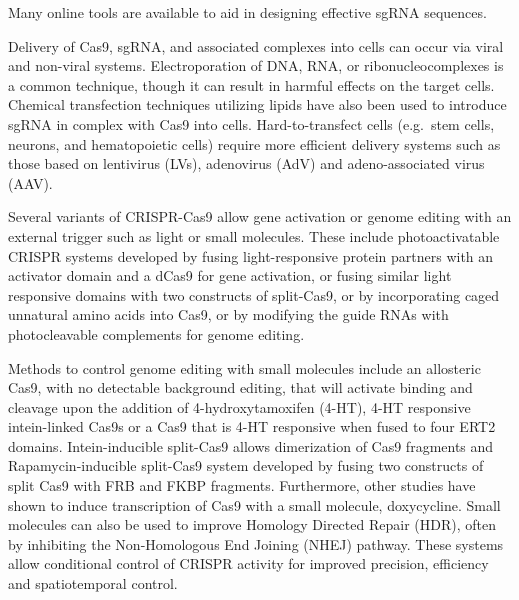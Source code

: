 Many online tools are available to aid in designing effective sgRNA sequences.

Delivery of Cas9, sgRNA, and associated complexes into cells can occur via viral and non-viral systems. Electroporation of DNA, RNA, or ribonucleocomplexes is a common technique, though it can result in harmful effects on the target cells. Chemical transfection techniques utilizing lipids have also been used to introduce sgRNA in complex with Cas9 into cells. Hard-to-transfect cells (e.g.~stem cells, neurons, and hematopoietic cells) require more efficient delivery systems such as those based on lentivirus (LVs), adenovirus (AdV) and adeno-associated virus (AAV).

Several variants of CRISPR-Cas9 allow gene activation or genome editing with an external trigger such as light or small molecules. These include photoactivatable CRISPR systems developed by fusing light-responsive protein partners with an activator domain and a dCas9 for gene activation, or fusing similar light responsive domains with two constructs of split-Cas9, or by incorporating caged unnatural amino acids into Cas9, or by modifying the guide RNAs with photocleavable complements for genome editing.

Methods to control genome editing with small molecules include an allosteric Cas9, with no detectable background editing, that will activate binding and cleavage upon the addition of 4-hydroxytamoxifen (4-HT), 4-HT responsive intein-linked Cas9s or a Cas9 that is 4-HT responsive when fused to four ERT2 domains. Intein-inducible split-Cas9 allows dimerization of Cas9 fragments and Rapamycin-inducible split-Cas9 system developed by fusing two constructs of split Cas9 with FRB and FKBP fragments. Furthermore, other studies have shown to induce transcription of Cas9 with a small molecule, doxycycline. Small molecules can also be used to improve Homology Directed Repair (HDR), often by inhibiting the Non-Homologous End Joining (NHEJ) pathway. These systems allow conditional control of CRISPR activity for improved precision, efficiency and spatiotemporal control.

